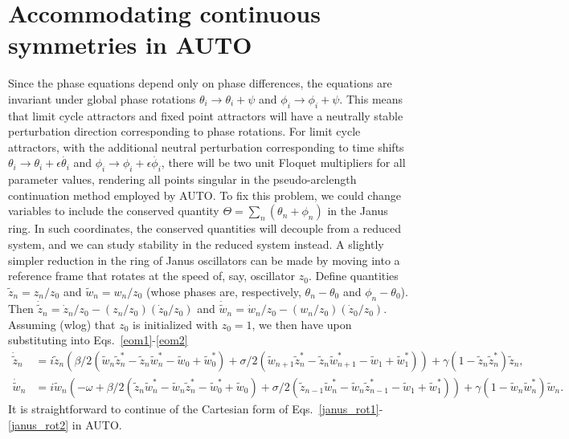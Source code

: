 \documentclass[aps,pre,amsmath,amssymb,floatfix,onecolumn,notitlepage,10pt]{revtex4-1}
\begin{document}
\section{Accommodating continuous symmetries in AUTO}
Since the phase equations depend only on phase differences, the equations are invariant under global phase rotations $\theta_i\to\theta_i+\psi$ and $\phi_i\to \phi_i+\psi$.  This means that limit cycle attractors and fixed point attractors will have a neutrally stable perturbation direction corresponding to phase rotations. For limit cycle attractors, with the additional neutral perturbation corresponding to time shifts $\theta_i\to\theta_i+\epsilon\dot{\theta_i}$ and $\phi_i\to\phi_i+\epsilon\dot{\phi_i}$, there will be two unit Floquet multipliers for all parameter values, rendering all points singular in the pseudo-arclength continuation method employed by AUTO. To fix this problem, we could change variables to include the conserved quantity $\Theta = \sum_n \left(\theta_n + \phi_n\right)$ in the Janus ring. In such coordinates, the conserved quantities will decouple from a reduced system, and we can study stability in the reduced system instead.  A slightly simpler reduction in the ring of Janus oscillators can be made by moving into a reference frame that rotates at the speed of, say, oscillator $z_0$. Define quantities $\tilde{z}_n = z_n/z_0$ and $\tilde{w}_n = w_n/z_0$ (whose phases are, respectively, $\theta_n-\theta_0$ and $\phi_n-\theta_0$).  Then $\dot {\tilde z}_n = \dot z_n / z_0 - \left(z_n/z_0\right)\left( \dot z_0/z_0\right)$ and $\dot {\tilde w}_n = \dot w_n / z_0 - \left(w_n/z_0\right) \left(\dot z_0/z_0\right)$. Assuming (wlog) that $z_0$ is initialized with $z_0=1$, we then have upon substituting into Eqs.~\ref{eom1}-\ref{eom2}
\begin{align}
\dot {\tilde z}_n &= i{\tilde z}_n\left(  \beta/2\left({\tilde w}_n{\tilde z}_n^*-{\tilde z}_n{\tilde w}_n^* - {\tilde w}_0+{\tilde w}_0^*\right) + \sigma/2\left({\tilde w}_{n+1}{\tilde z}_n^*-{\tilde z}_n{\tilde w}_{n+1}^* - {\tilde w}_1+{\tilde w}_1^*\right)\right) + \gamma\left(1-{\tilde z}_n{\tilde z}_n^*\right){\tilde z}_n, \label{janus_rot1}\\
\dot {\tilde w}_n &= i{\tilde w}_n\left( -\omega + \beta/2\left({\tilde z}_n{\tilde w}_n^*-{\tilde w}_n{\tilde z}_n^* -{\tilde w}_0^*+{\tilde w}_0 \right) + \sigma/2\left({\tilde z}_{n-1}{\tilde w}_n^*-{\tilde w}_n{\tilde z}_{n-1}^* - {\tilde w}_1+{\tilde w}_1^*\right)\right) + \gamma\left(1-{\tilde w}_n{\tilde w}_n^*\right){\tilde w}_n. \label{janus_rot2}
\end{align}
It is straightforward to continue of the Cartesian form of Eqs.~\eqref{janus_rot1}-\eqref{janus_rot2} in AUTO.
\end{document}
